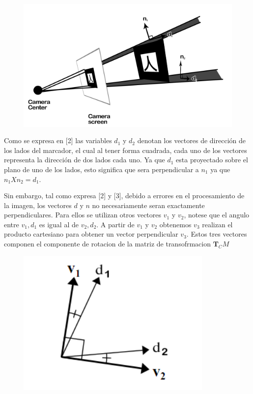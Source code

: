 \documentclass[runningheads]{llncs}
\begin{document}
\begin{figure}
	\centering
	\includegraphics[width=0.7\linewidth]{Imagenes/ar-normales}
	\caption{}
	\label{fig:ar-normales}
\end{figure}

Como se expresa en [2] las variables $d_1$ y $ d_2 $ denotan los vectores de dirección de los lados del marcador, el cual al tener forma cuadrada, cada uno de los vectores representa la dirección de dos lados cada uno. Ya que $ d_1 $ esta proyectado sobre el plano de uno de los lados, esto significa que sera perpendicular a $ n_1 $ ya que $ n_1 X n_2 = d_1 $.

Sin embargo, tal como expresa [2] y [3], debido a errores en el procesamiento de la imagen, los vectores $d$ y $n$ no necesariamente seran exactamente perpendiculares. Para ellos se utilizan otros vectores $v_1$ y $ v_2 $, notese que el angulo entre $ v_1, d_1 $ es igual al de $v_2,d_2$. A partir de $v_1$ y $ v_2 $ obtenemos $ v_3 $ realizan el producto cartesiano para obtener un vector perpendicular $v_3$. Estos tres vectores componen el componente de rotacion de la matriz de transofrmacion $\textbf{T}_CM$

\begin{figure}
	\centering
	\includegraphics[width=0.7\linewidth]{Imagenes/ar-d1d2}
	\caption{}
	\label{fig:ar-d1d2}
\end{figure}
\end{document}
